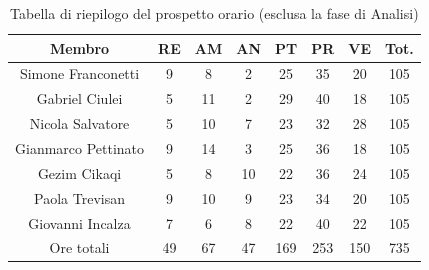 \begin{table}[h]
	\caption{Tabella di riepilogo del prospetto orario (esclusa la fase di Analisi)} 
\begin{center}
\begin{tabular}{ |c|c|c|c|c|c|c|c|  }
 \hline
 Membro 		& RE 		& AM 		& AN 	& PT 	& PR 	& VE 	& Tot.\\
 \hline\hline
 Simone	Franconetti		& 9  	 	& 8			& 2 		& 25 		& 35 		& 20 		& 105\\
 Gabriel Ciulei		& 5 			& 11 		& 2 		& 29			& 40 		& 18 		& 105\\
 Nicola	Salvatore		& 5  		& 10 		& 7 		& 23 		& 32 		& 28 		& 105\\
 Gianmarco	Pettinato	& 9   		& 14 		& 3 		& 25		 	& 36 		& 18 		& 105\\
 Gezim	Cikaqi		& 5  		& 8  		& 10		& 22 		& 36 		& 24	 	& 105\\
 Paola	Trevisan		& 9  		& 10 		& 9 		& 23 		& 34 		& 20 		& 105\\
 Giovanni	Incalza	& 7  		& 6	 		& 8 		& 22 		& 40		 	& 22  		& 105\\
 \hline\hline
 Ore totali		& 49 	& 67		& 47 	& 169 	& 253 	& 150 	& 735\\
  \hline
\end{tabular}
\end{center}
\end{table}
